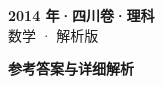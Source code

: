 \documentclass[zihao=-4, a4paper]{ctexart}
\begin{document}
\begin{center}
  {\Large\bfseries 2014 年·四川卷·理科}\\[4pt]
  {\large 数学 · 解析版}
\end{center}
\medskip
{}

\clearpage
{}
\begin{center}{\Large\bfseries 参考答案与详细解析}\end{center}
\medskip

\end{document}
